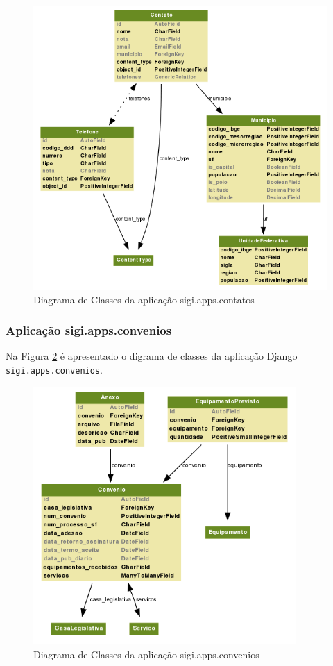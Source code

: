 \begin{figure}[h]
  \centering
  \includegraphics[width=120mm]{../imagens/contatos.png}
  \caption{Diagrama de Classes da aplicação sigi.apps.contatos}
  \label{fig:contatos}
\end{figure}

\subsubsection{Aplicação sigi.apps.convenios}
Na Figura \ref{fig:convenios} é apresentado o digrama de classes da
aplicação Django \verb|sigi.apps.convenios|.

\begin{figure}[h]
  \centering
  \includegraphics[width=100mm]{../imagens/convenios.png}
  \caption{Diagrama de Classes da aplicação sigi.apps.convenios}
  \label{fig:convenios}
\end{figure}

